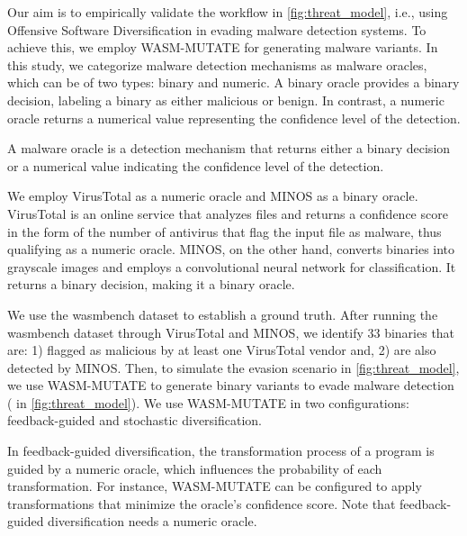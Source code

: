
Our aim is to empirically validate the workflow in \autoref{fig:threat_model}, i.e., using Offensive Software Diversification in evading malware detection systems.
To achieve this, we employ WASM-MUTATE for generating \Wasm malware variants.
In this study, we categorize malware detection mechanisms as malware oracles, which can be of two types: binary and numeric. 
A binary oracle provides a binary decision, labeling a \Wasm binary as either malicious or benign. 
In contrast, a numeric oracle returns a numerical value representing the confidence level of the detection.

\begin{definition}
    \label{malware_oracle_def}
    A malware oracle is a detection mechanism that returns either a binary decision or a numerical value indicating the confidence level of the detection.
\end{definition}


We employ VirusTotal as a numeric oracle and MINOS \cite{MINOS} as a binary oracle. 
VirusTotal is an online service that analyzes files and returns a confidence score in the form of the number of antivirus that flag the input file as malware, thus qualifying as a numeric oracle. 
MINOS, on the other hand, converts \Wasm binaries into grayscale images and employs a convolutional neural network for classification. 
It returns a binary decision, making it a binary oracle.


We use the wasmbench dataset \cite{Hilbig2021AnES} to establish a ground truth. 
After running the wasmbench dataset through VirusTotal and MINOS, we identify 33 binaries that are: 1) flagged as malicious by at least one VirusTotal vendor and, 2) are also detected by MINOS.
Then, to simulate the evasion scenario in \autoref{fig:threat_model}, we use WASM-MUTATE to generate \Wasm binary variants to evade malware detection ( in \autoref{fig:threat_model}).
We use WASM-MUTATE in two configurations: feedback-guided and stochastic diversification.

\begin{definition}
    \label{controlled_def}
    In feedback-guided diversification, the transformation process of a \Wasm program is guided by a numeric oracle, which influences the probability of each transformation. For instance, WASM-MUTATE can be configured to apply transformations that minimize the oracle's confidence score. Note that feedback-guided diversification needs a numeric oracle.
\end{definition}


